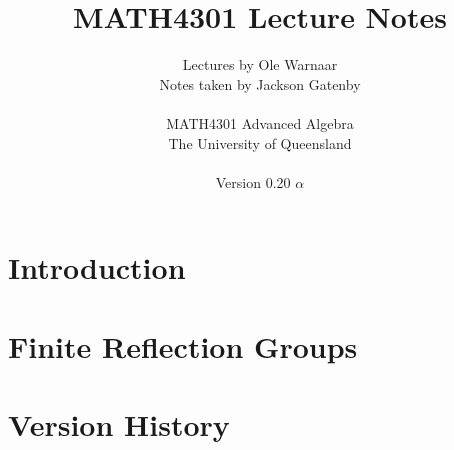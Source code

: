 \documentclass[a4paper]{report}
\title{MATH4301 Lecture Notes}
\author{Lectures by Ole Warnaar\\
Notes taken by Jackson Gatenby\\
\\
MATH4301 Advanced Algebra\\
The University of Queensland\\
\\
Version 0.20 $\alpha$}
\begin{document}
\maketitle
\tableofcontents

%

\chapter{Introduction}







\chapter{Finite Reflection Groups}


















\appendix

\chapter{Version History}

\end{document}
